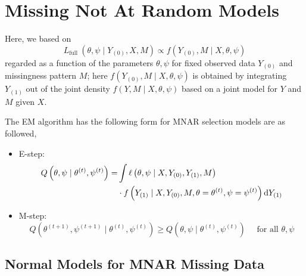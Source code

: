 \begin{example}

\end{example}

\section{Missing Not At Random Models}

Here, we based on
\begin{equation}
	L_{\text {full }}\left(\theta, \psi \mid Y_{(0)}, X, M\right) \propto f\left(Y_{(0)}, M \mid X, \theta, \psi\right)
\end{equation}
regarded as a function of the parameters $\theta, \psi$ for fixed observed data $Y_{(0)}$ and missingness pattern $M$; here $f\left(Y_{(0)}, M \mid X, \theta, \psi\right)$ is obtained by integrating $Y_{(1)}$ out of the joint density $f(Y, M \mid X, \theta, \psi)$ based on a joint model for $Y$ and $M$ given $X$.

The EM algorithm has the following form for MNAR selection models are as followed,
\begin{itemize}
	\item E-step:
	      \begin{equation}
		      \begin{aligned}
			      Q\left(\theta, \psi \mid \theta^{(t)}, \psi^{(t)}\right)= & \int \ell\left(\theta, \psi \mid X, Y_{(0)}, Y_{(1)}, M\right)                                   \\
			                                                                & \cdot f\left(Y_{(1)}\mid X, Y_{(0)}, M, \theta=\theta^{(t)}, \psi=\psi^{(t)}\right) \mathop{}\!\mathrm{d} Y_{(1)}
		      \end{aligned}
	      \end{equation}
	\item M-step:
	      \begin{equation}
		      Q\left(\theta^{(t+1)}, \psi^{(t+1)} \mid \theta^{(t)}, \psi^{(t)}\right) \geq Q\left(\theta, \psi \mid \theta^{(t)}, \psi^{(t)}\right) \quad \text { for all } \theta, \psi
	      \end{equation}
\end{itemize}

\subsection{Normal Models for MNAR Missing Data}

